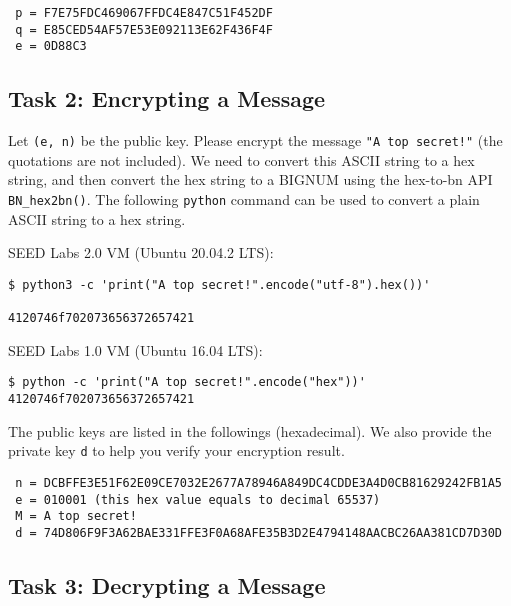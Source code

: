 \begin{lstlisting}
 p = F7E75FDC469067FFDC4E847C51F452DF
 q = E85CED54AF57E53E092113E62F436F4F
 e = 0D88C3
\end{lstlisting}


\subsection{Task 2: Encrypting a Message}

Let \texttt{(e, n)} be the public key. Please encrypt the message
\texttt{"A top secret!"} (the quotations are not included).
We need to convert this ASCII string to a hex string, and then
convert the hex string to a BIGNUM using the hex-to-bn API \texttt{BN\_hex2bn()}.
The following \texttt{python} command can be used
to convert a plain ASCII string to a hex string.

SEED Labs 2.0 VM (Ubuntu 20.04.2 LTS):
\begin{lstlisting}
$ python3 -c 'print("A top secret!".encode("utf-8").hex())'

4120746f702073656372657421
\end{lstlisting}

SEED Labs 1.0 VM (Ubuntu 16.04 LTS):
\begin{lstlisting}
$ python -c 'print("A top secret!".encode("hex"))'
4120746f702073656372657421
\end{lstlisting}


The public keys are listed in the followings (hexadecimal).  We also provide the private key \texttt{d}
 to help you verify your encryption
result.

\begin{lstlisting}
 n = DCBFFE3E51F62E09CE7032E2677A78946A849DC4CDDE3A4D0CB81629242FB1A5
 e = 010001 (this hex value equals to decimal 65537)
 M = A top secret!
 d = 74D806F9F3A62BAE331FFE3F0A68AFE35B3D2E4794148AACBC26AA381CD7D30D
\end{lstlisting}



\subsection{Task 3: Decrypting a Message}

